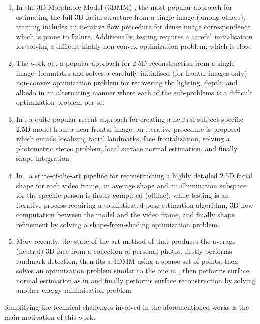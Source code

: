 \begin{enumerate}
\item In the 3D Morphable Model (3DMM) \cite{blanz1999morphable,
    romdhani2005estimating}, the most popular approach for estimating
  the full 3D facial structure from a single image (among others),
  training includes an iterative flow procedure for dense image
  correspondence which is prone to failure. Additionally, testing requires a
  careful initialisation for solving a difficult highly non-convex
  optimization problem, which is slow.
\item The work of \cite{kemelmacher20113d}, a popular approach for
  2.5D reconstruction from a single image, formulates and solves a
  carefully initialised (for frontal images only) non-convex
  optimization problem for recovering the lighting, depth, and albedo
  in an alternating manner where each of the sub-problems is a
  difficult optimization problem per se.
\item In \cite{kemelmacher2011face}, a quite popular recent approach
  for creating a neutral subject-specific 2.5D model from a near
  frontal image, an iterative procedure is proposed which entails
  localising facial landmarks, face frontalization, solving a
  photometric stereo problem, local surface normal estimation, and
  finally shape integration.
\item In \cite{suwajanakorn2014total}, a state-of-the-art pipeline for
  reconstructing a highly detailed 2.5D facial shape for each video
  frame, an average shape and an illumination subspace for the
  specific person is firstly computed (offline), while testing is an
  iterative process requiring a sophisticated pose estimation
  algorithm, 3D flow computation between the model and the video
  frame, and finally shape refinement by solving a shape-from-shading
  optimization problem.
\item More recently, the state-of-the-art method of
  \cite{roth2016adaptive} that produces the average (neutral) 3D face
  from a collection of personal photos, firstly performs landmark
  detection, then fits a 3DMM using a sparse set of points, then
  solves an optimization problem similar to the one in
  \cite{kemelmacher2011face}, then performs surface normal estimation
  as in \cite{kemelmacher2011face} and finally performs surface
  reconstruction by solving another energy minimisation problem.
\end{enumerate}

Simplifying the technical challenges involved in the aforementioned
works is the main motivation of this work.

